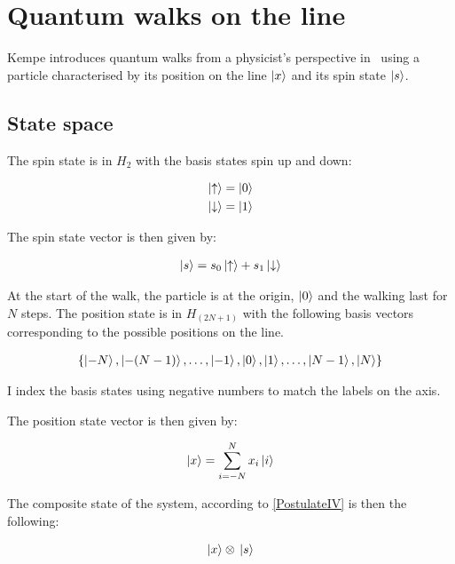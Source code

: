 \section{Quantum walks on the line}

Kempe introduces quantum walks from a physicist's perspective in~\cite{KempeIntroduction} using a particle characterised by its position on the line $\ket{x}$ and its spin state $\ket{s}$.

\subsection{State space}


The spin state is in $H_2$ with the basis states spin up and down:

\begin{align*}
\ket{\uparrow} = \ket{0} \\
\ket{\downarrow} = \ket{1}
\end{align*}

The spin state vector is then given by:

\begin{align*}
\ket{s} = s_0 \ket{\uparrow} + s_1 \ket{\downarrow}
\end{align*}


At the start of the walk, the particle is at the origin, $\ket{0}$ and the walking last for $N$ steps. The position state is in $H_{(2N+1)}$ with the following basis vectors corresponding to the possible positions on the line.

\begin{align*}
\{
\ket{-N},\ket{-(N-1)},\dots,
\ket{-1},\ket{0},\ket{1},\dots,
\ket{N-1},\ket{N}
\}
\end{align*}

I index the basis states using negative numbers to match the labels on the axis.

The position state vector is then given by:

\begin{align*}
    \ket{x} = \sum\limits_{i=-N}^{N}x_i\ket{i}
\end{align*}


The composite state of the system, according to \hyperref[PostulateIV]{[PostulateIV]} is then the following:

\begin{align*}
    \ket{x}\otimes{}\ket{s}
\end{align*}

